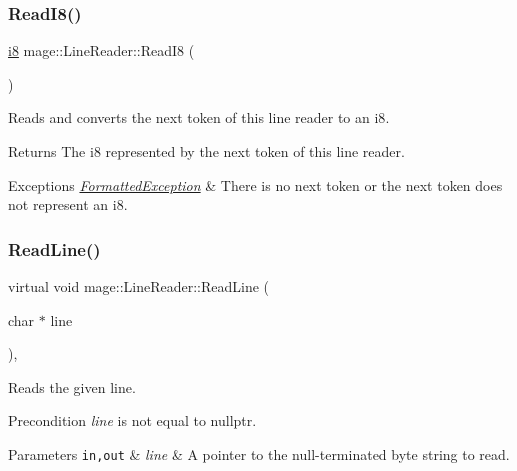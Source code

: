 \subsubsection{\texorpdfstring{Read\+I8()}{ReadI8()}}
{\footnotesize\ttfamily \hyperlink{namespacemage_ae590501eabc5b30d993320c2159423ee}{i8} mage\+::\+Line\+Reader\+::\+Read\+I8 (\begin{DoxyParamCaption}{ }\end{DoxyParamCaption})\hspace{0.3cm}{\ttfamily [protected]}}

Reads and converts the next token of this line reader to an {\ttfamily i8}.

\begin{DoxyReturn}{Returns}
The {\ttfamily i8} represented by the next token of this line reader. 
\end{DoxyReturn}

\begin{DoxyExceptions}{Exceptions}
{\em \hyperlink{structmage_1_1_formatted_exception}{Formatted\+Exception}} & There is no next token or the next token does not represent an {\ttfamily i8}. \\
\hline
\end{DoxyExceptions}
\hypertarget{classmage_1_1_line_reader_acfb2f7279ec77d070a86d7db812d4745}{}\label{classmage_1_1_line_reader_acfb2f7279ec77d070a86d7db812d4745} 
\subsubsection{\texorpdfstring{Read\+Line()}{ReadLine()}}
{\footnotesize\ttfamily virtual void mage\+::\+Line\+Reader\+::\+Read\+Line (\begin{DoxyParamCaption}\item[{char $\ast$}]{line }\end{DoxyParamCaption})\hspace{0.3cm}{\ttfamily [private]}, {}}

Reads the given line.

\begin{DoxyPrecond}{Precondition}
{\itshape line} is not equal to {\ttfamily nullptr}. 
\end{DoxyPrecond}

\begin{DoxyParams}[1]{Parameters}
\mbox{\tt in,out}  & {\em line} & A pointer to the null-\/terminated byte string to read. \\
\hline
\end{DoxyParams}

